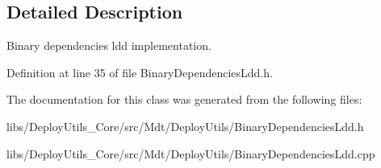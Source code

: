 \subsection{Detailed Description}
Binary dependencies ldd implementation. 

Definition at line 35 of file Binary\+Dependencies\+Ldd.\+h.



The documentation for this class was generated from the following files\+:\begin{DoxyCompactItemize}
\item 
libs/\+Deploy\+Utils\+\_\+\+Core/src/\+Mdt/\+Deploy\+Utils/Binary\+Dependencies\+Ldd.\+h\item 
libs/\+Deploy\+Utils\+\_\+\+Core/src/\+Mdt/\+Deploy\+Utils/Binary\+Dependencies\+Ldd.\+cpp\end{DoxyCompactItemize}
